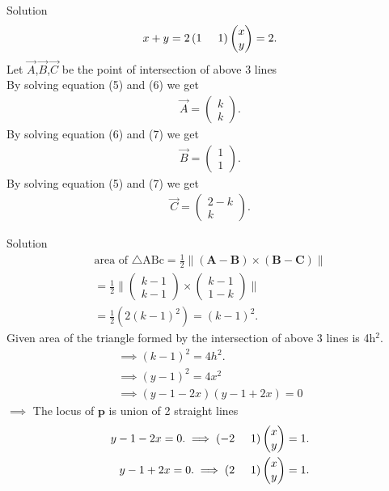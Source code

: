 \documentclass{beamer}
\numberwithin{equation}{section}
\providecommand{\brak}[1]{\ensuremath{\left(#1\right)}}
\theoremstyle{remark}
\providecommand{\norm}[1]{\lVert#1\rVert}
\newcommand{\myvec}[1]{\ensuremath{\begin{pmatrix}#1\end{pmatrix}}}
\let\vec\mathbf
\begin{document}
    \begin{frame}{Solution}
        \begin{align}
    x+y=2 \brak{1\hspace{0.5cm}1}\myvec{x\\y}=2.
\end{align}
Let $\Vec{A}$,$\Vec{B}$,$\Vec{C}$ be the point of intersection of above 3 lines\\
By solving equation (5) and (6) we get
\begin{align}
    \Vec{A}=\myvec{k\\k}.
\end{align}
By solving equation (6) and (7) we get
\begin{align}
    \Vec{B}=\myvec{1\\1}.
\end{align}
By solving equation (5) and (7) we get
\begin{align}
    \Vec{C}=\myvec{2-k\\k}.
\end{align}
\end{frame}
\begin{frame}{Solution}
\begin{align}
    \text{area of }\triangle \text{ABc}=\frac{1}{2}\norm{(\vec{A}-\vec{B})\times(\vec{B}-\vec{C})}\\
    =\frac{1}{2}\norm{\myvec{k-1\\k-1}\times\myvec{k-1\\1-k}}\\
    =\frac{1}{2}(2(k-1)^2)=(k-1)^2.
\end{align}
Given area of the triangle formed by the intersection of above 3 lines is 4h$^2$.
\begin{align}
    \implies (k-1)^2= 4h^2.\\
    \implies (y-1)^2=4x^2\\
    \implies(y-1-2x)(y-1+2x)=0
    \end{align}
    $\implies$ The locus of $\vec{p}$ is union of 2 straight lines
    \begin{align}
     y-1-2x=0. \implies  \brak{-2\hspace{0.5cm}1}\myvec{x\\y}=1.\\
     y-1+2x=0. \implies  \brak{2\hspace{0.5cm}1}\myvec{x\\y}=1.
   \end{align}
    \end{frame}
\end{document}
